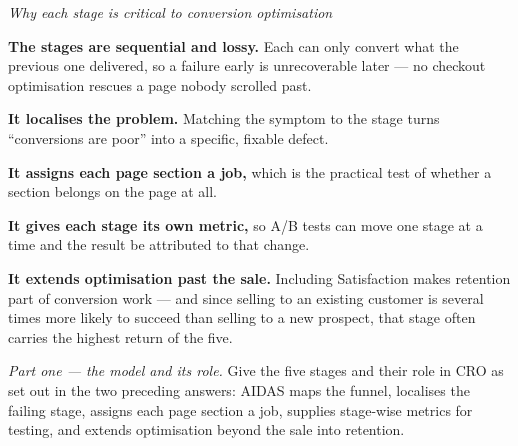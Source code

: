 \begin{qlist}
\textit{Why each stage is critical to conversion optimisation}
\begin{apts}\setcounter{enumi}{5}
\item \textbf{The stages are sequential and lossy.} Each can only convert what
      the previous one delivered, so a failure early is unrecoverable later ---
      no checkout optimisation rescues a page nobody scrolled past.
\item \textbf{It localises the problem.} Matching the symptom to the stage turns
      ``conversions are poor'' into a specific, fixable defect.
\item \textbf{It assigns each page section a job,} which is the practical test
      of whether a section belongs on the page at all.
\item \textbf{It gives each stage its own metric,} so A/B tests can move one
      stage at a time and the result be attributed to that change.
\item \textbf{It extends optimisation past the sale.} Including Satisfaction
      makes retention part of conversion work --- and since selling to an
      existing customer is several times more likely to succeed than selling to
      a new prospect, that stage often carries the highest return of the five.
\end{apts}

\textit{Part one --- the model and its role.} Give the five stages and their
role in CRO as set out in the two preceding answers: AIDAS maps the funnel,
localises the failing stage, assigns each page section a job, supplies stage-wise
metrics for testing, and extends optimisation beyond the sale into retention.


\end{qlist}
